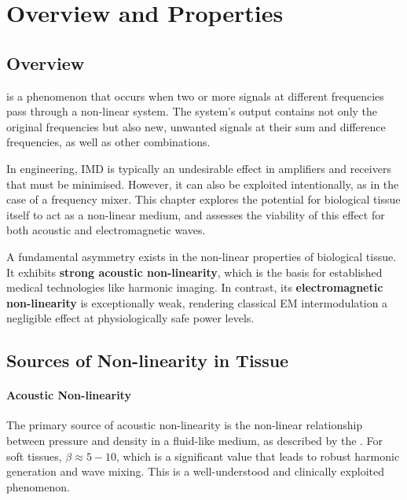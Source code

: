 \section{Overview and Properties}

\subsection{Overview}

 is a phenomenon that occurs when two or more signals at different frequencies pass through a non-linear system. The system's output contains not only the original frequencies but also new, unwanted signals at their sum and difference frequencies, as well as other combinations.

In engineering, IMD is typically an undesirable effect in amplifiers and receivers that must be minimised. However, it can also be exploited intentionally, as in the case of a frequency mixer. This chapter explores the potential for biological tissue itself to act as a non-linear medium, and assesses the viability of this effect for both acoustic and electromagnetic waves.

\begin{keyconcept}
    A fundamental asymmetry exists in the non-linear properties of biological tissue. It exhibits \textbf{strong acoustic non-linearity}, which is the basis for established medical technologies like harmonic imaging. In contrast, its \textbf{electromagnetic non-linearity} is exceptionally weak, rendering classical EM intermodulation a negligible effect at physiologically safe power levels.
\end{keyconcept}


\subsection{Sources of Non-linearity in Tissue}

\paragraph{Acoustic Non-linearity}
The primary source of acoustic non-linearity is the non-linear relationship between pressure and density in a fluid-like medium, as described by the . For soft tissues, $\beta \approx 5-10$, which is a significant value that leads to robust harmonic generation and wave mixing. This is a well-understood and clinically exploited phenomenon.

